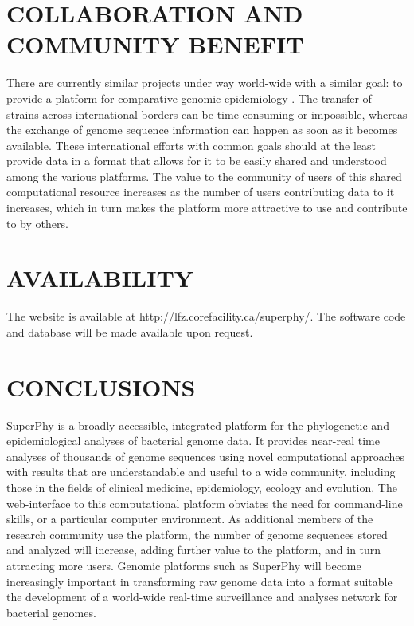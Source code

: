 \documentclass[a4paper,twoside]{article}
\begin{document}
{\section{\uppercase{Collaboration and Community Benefit}}
\label{sec:collaboration}
There are currently similar projects under way world-wide with a similar goal: to provide a platform for comparative genomic epidemiology \cite{kupferschmidt_outbreak_2011}. The transfer of strains across international borders can be time consuming or impossible, whereas the exchange of genome sequence information can happen as soon as it becomes available. These international efforts with common goals should at the least provide data in a format that allows for it to be easily shared and understood among the various platforms. The value to the community of users of this shared computational resource increases as the number of users contributing data to it increases, which in turn makes the platform more attractive to use and contribute to by others.

\section{\uppercase{Availability}}
\label{sec:availability}

The website is available at http://lfz.corefacility.ca/superphy/. The software code and database will be made available upon request.

\section{\uppercase{Conclusions}}
\label{sec:conclusion}

\noindent SuperPhy is a broadly accessible, integrated platform for the phylogenetic and epidemiological analyses of bacterial genome data. It provides near-real time analyses of thousands of genome sequences using novel computational approaches with results that are understandable and useful to a wide community, including those in the fields of clinical medicine, epidemiology, ecology and evolution. The web-interface to this computational platform obviates the need for command-line skills, or a particular computer environment. As additional members of the research community use the platform, the number of genome sequences stored and analyzed will increase, adding further value to the platform, and in turn attracting more users. Genomic platforms such as SuperPhy will become increasingly important in transforming raw genome data into a format suitable the development of a world-wide real-time surveillance and analyses network for bacterial genomes.
 
}
\end{document}
